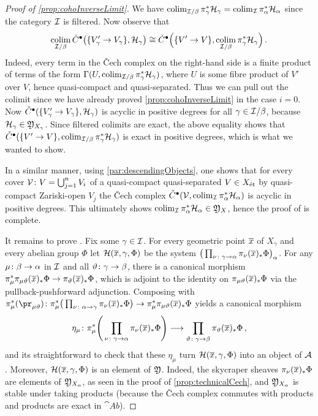 \begin{proof}[Proof of \cref{prop:cohoInverseLimit}]
	We have $\operatorname*{colim}_{\mathcal{I}/\beta}\pi_\gamma^*\mathcal{H}_\gamma=\operatorname*{colim}_{\mathcal{I}}\pi_\alpha^*\mathcal{H}_\alpha$ since the category $\mathcal{I}$ is filtered. Now observe that
	\begin{equation*}
	\operatorname*{colim}_{\mathcal{I}/\beta}\check{C}^\bullet\big(\{V'_\gamma\rightarrow V_\gamma\},\mathcal{H}_\gamma\big)\cong\check{C}^\bullet\Big(\{V'\rightarrow V\},\operatorname*{colim}_{\mathcal{I}/\beta}\pi_\gamma^*\mathcal{H}_\gamma\Big)\,.
	\end{equation*}
	Indeed, every term in the \v Cech complex on the right-hand side is a finite product of terms of the form $\operatorname{\Gamma}(U,\operatorname*{colim}_{\mathcal{I}/\beta}\pi_\gamma^*\mathcal{H}_\gamma)$, where $U$ is some fibre product of $V'$ over $V$, hence quasi-compact and quasi-separated. Thus we can pull out the colimit since we have already proved \cref{prop:cohoInverseLimit} in the case $i=0$. Now $\check{C}^\bullet(\{V'_\gamma\rightarrow V_\gamma\},\mathcal{H}_\gamma)$ is acyclic in positive degrees for all $\gamma\in \mathcal{I}/\beta$, because $\mathcal{H}_\gamma\in \mathfrak{Y}_{X_\gamma}$. Since filtered colimits are exact, the above equality shows that $\check{C}^\bullet(\{V'\rightarrow V\},\operatorname*{colim}_{\mathcal{I}/\beta}\pi_\gamma^*\mathcal{H}_\gamma)$ is exact in positive degrees, which is what we wanted to show.
	
	In a similar manner, using \cref{par:descendingObjects}, one shows that for every cover $\mathcal{V}\colon V=\bigcup_{j=1}^nV_i$ of a quasi-compact quasi-separated $V\in X_{\mathrm{\acute{e}t}}$ by quasi-compact Zariski-open $V_j$ the \v Cech complex $\check{C}^\bullet(\mathcal{V},\operatorname*{colim}_{\mathcal{I}}\pi_\alpha^*\mathcal{H}_\alpha)$ is acyclic in positive degrees. This ultimately shows $\operatorname*{colim}_{\mathcal{I}}\pi_\alpha^*\mathcal{H}_\alpha\in \mathfrak{Y}_X$, hence the proof of \itememph{*} is complete.
	
	It remains to prove . Fix some $\gamma\in \mathcal{I}$. For every geometric point $\ov{x}$ of $X_\gamma$ and every abelian group $\Phi$ let $\Hh(\ov{x},\gamma,\Phi)$ be the system $\big(\prod_{\nu\colon \gamma\morphism \alpha}\pi_\nu(\ov{x})_*\Phi\big)_\alpha$. For any $\mu\colon \beta\morphism \alpha$ in $\mathcal{I}$ and all $\vartheta\colon \gamma\morphism\beta$, there is a canonical morphism $\pi_\mu^*\pi_{\mu\vartheta}(\ov{x})_*\Phi\morphism \pi_{\vartheta}(\ov{x})_*\Phi$, which is adjoint to the identity on $\pi_{\mu\vartheta}(\ov{x})_*\Phi$ via the pullback-pushforward adjunction. Composing with $\pi_\mu^*(\pr_{\mu\vartheta})\colon \pi_\mu^*\big(\prod_{\nu\colon \alpha\morphism\gamma}\pi_\nu(\ov{x})_*\Phi\big)\morphism \pi_\mu^*\pi_{\mu\vartheta}(\ov{x})_*\Phi$ yields a canonical morphism
	\begin{equation*}
	\eta_\mu\colon \pi_\mu^*\Bigg(\prod_{\nu\colon \gamma\morphism\alpha}\pi_\nu(\ov{x})_*\Phi\Bigg)\morphism \prod_{\vartheta\colon \gamma\morphism \beta}\pi_{\vartheta}(\ov{x})_*\Phi\,,
	\end{equation*}
	and its straightforward to check that these $\eta_\mu$ turn $\Hh(\ov{x},\gamma,\Phi)$ into an object of $\mathcal{A}$. Moreover, $\Hh(\ov{x},\gamma,\Phi)$ is an element of $\mathfrak{Y}$. Indeed, the skycraper sheaves $\pi_\nu(\ov{x})_*\Phi$ are elements of $\mathfrak{Y}_{X_\alpha}$, as seen in the proof of \cref{prop:technicalCech}, and $\mathfrak{Y}_{X_\alpha}$ is stable under taking products (because the \v Cech complex commutes with products and products are exact in $\cat{Ab}$).
	

\end{proof}

